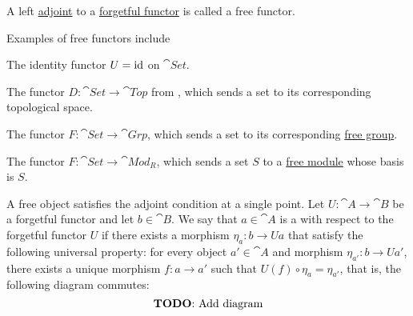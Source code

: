 \begin{definition}\label{def:free_functor}
  A left \hyperref[subsec:adjoint_functors]{adjoint} to a \hyperref[def:forgetful_functor]{forgetful functor} is called a free functor.
\end{definition}

\begin{example}\label{ex:free_functors}
  Examples of free functors include

  \begin{thmenum}
    \item The identity functor \( U = \operatorname{id} \) on \( \cat{Set} \).
    \item The functor \( D: \cat{Set} \to \cat{Top} \) from , which sends a set to its corresponding topological space.
    \item The functor \( F: \cat{Set} \to \cat{Grp} \), which sends a set to its corresponding \hyperref[def:free_group]{free group}.
    \item The functor \( F: \cat{Set} \to \cat{Mod}_R \), which sends a set \( S \) to a \hyperref[def:free_left_module]{free module} whose basis is \( S \).
  \end{thmenum}
\end{example}

\begin{definition}\label{def:free_object}
  A free object satisfies the adjoint condition at a single point. Let \( U: \cat{A} \to \cat{B} \) be a forgetful functor and let \( b \in \cat{B} \). We say that \( a \in \cat{A} \) is a  with respect to the forgetful functor \( U \) if there exists a morphism \( \eta_{a}: b \to Ua \) that satisfy the following universal property: for every object \( a' \in \cat{A} \) and morphism \( \eta_{a'}: b \to Ua' \), there exists a unique morphism \( f: a \to a' \) such that \( U(f) \circ \eta_a = \eta_{a'} \), that is, the following diagram commutes:
  \begin{equation*}
    \text{\todo{Add diagram}}\iffalse\begin{mplibcode}
      beginfig(1);
      input metapost/graphs;

      v1 := thelabel("$b$", origin);
      v2 := thelabel("$U(a)$", (-1, -1) scaled u);
      v3 := thelabel("$U(a')$", (1, -1) scaled u);

      a1 := straight_arc(v1, v2);
      a2 := straight_arc(v1, v3);

      d1 := straight_arc(v2, v3);

      draw_vertices(v);
      draw_arcs(a);

      drawarrow d1 dotted;

      label.ulft("$\eta_{a}$", straight_arc_midpoint of a1);
      label.urt("$\eta_{a'}$", straight_arc_midpoint of a2);
      label.top("$U(f)$", straight_arc_midpoint of d1);
      endfig;
    \end{mplibcode}\fi
  \end{equation*}
\end{definition}
